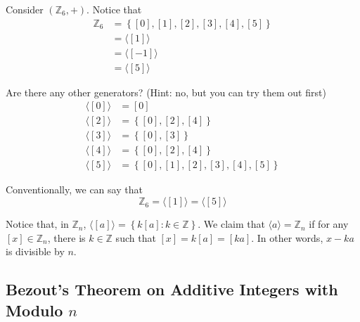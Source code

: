 \begin{nexample}
    Consider \((\mathbb{Z}_6, +)\). Notice that
    \[
    \begin{aligned}
        \mathbb{Z}_6 &= \left\{[0], [1], [2], [3], [4], [5]\right\} \\
                     &= \langle [1] \rangle \\
                     &= \langle [-1] \rangle \\
                     &= \langle [5] \rangle 
    \end{aligned}
    \]

    Are there any other generators? (Hint: no, but you can try them out first)
    \[
    \begin{aligned}
        \langle [0] \rangle &= [0] \\
        \langle [2] \rangle &= \left\{[0], [2], [4]\right\} \\
        \langle [3] \rangle &= \left\{[0], [3]\right\} \\
        \langle [4] \rangle &= \left\{[0], [2], [4]\right\} \\
        \langle [5] \rangle &= \left\{[0], [1], [2], [3], [4], [5]\right\}
    \end{aligned}
    \]

    Conventionally, we can say that
    \[
        \mathbb{Z}_6 = \langle [1] \rangle = \langle [5] \rangle
    \]
\end{nexample}

Notice that, in \(\mathbb{Z}_n\), \(\langle [a] \rangle = \left\{k[a] : k \in \mathbb{Z}\right\}\). We claim that \(\langle a \rangle = \mathbb{Z}_n\) if for any \([x] \in \mathbb{Z}_n\), there is \(k \in \mathbb{Z}\) such that \([x] = k[a] = [ka]\). In other words, \(x - ka\) is divisible by \(n\).

\subsection{Bezout's Theorem on Additive Integers with Modulo \(n\)}

